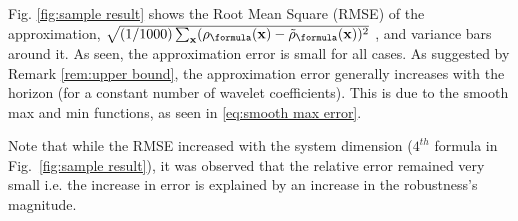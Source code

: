Fig. \ref{fig:sample result} shows the Root Mean Square (RMSE) of the approximation, $\sqrt{(1/1000)\sum_{\sstraj}(\robf(\sstraj)-\srobf(\sstraj))^2}$
, and variance bars around it. As seen, the approximation error is small for all cases.
As suggested by Remark \ref{rem:upper bound}, the approximation error generally increases with the horizon (for a constant number of wavelet coefficients).
This is due to the smooth max and min functions, as seen in \eqref{eq:smooth max error}.





Note that while the RMSE  increased with the system dimension ($4^{th}$ formula in Fig.~\ref{fig:sample result}), it was observed that the relative error remained very small i.e. the increase in error is explained by an increase in the robustness's magnitude. 


